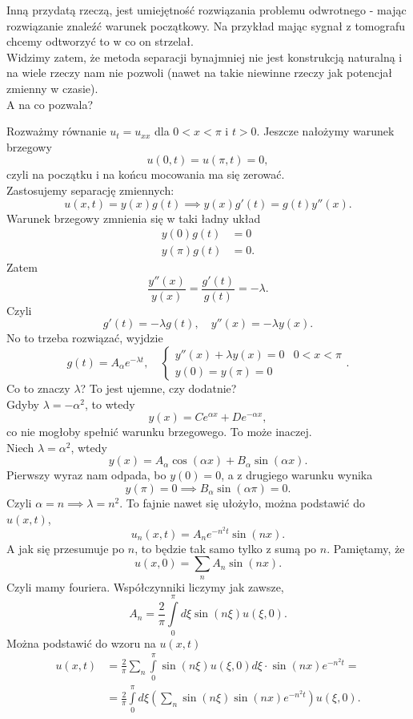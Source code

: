 \documentclass[../main.tex]{subfiles}
\begin{document}
				 Inną przydatą rzeczą, jest umiejętność rozwiązania problemu odwrotnego - mając rozwiązanie znaleźć warunek początkowy. Na przykład mając sygnał z tomografu chcemy odtworzyć to w co on strzelał.\\
				 Widzimy zatem, że metoda separacji bynajmniej nie jest konstrukcją naturalną i na wiele rzeczy nam nie pozwoli (nawet na takie niewinne rzeczy jak potencjał zmienny w czasie).\\
				 A na co pozwala?
				 \begin{przyklad}
				 		Rozważmy równanie $u_t = u_{x x}$ dla $0<x<\pi$ i $t > 0.$
						Jeszcze nałożymy warunek brzegowy
						 \[
								 u(0,t) = u(\pi,t) = 0
						 ,\]
						 czyli na początku i na końcu mocowania ma się zerować.\\
						 Zastosujemy separację zmiennych:
						 \[
								 u(x,t) = y(x) g(t) \implies y(x)g'(t) = g(t)y''(x)
						 .\]
						 Warunek brzegowy zmnienia się w taki ładny układ
						 \begin{align*}
								 y(0)g(t) &= 0\\
								 y(\pi)g(t) &= 0
						 .\end{align*}
						 Zatem
						 \[
								 \frac{y''(x)}{y(x)} = \frac{g'(t)}{g(t)} = -\lambda
						 .\]
						 Czyli
						 \[
								 g'(t) = -\lambda g(t),\quad y''(x) = -\lambda y(x)
						 .\]
						 No to trzeba rozwiązać, wyjdzie
						 \[
								 g(t) = A_\alpha e^{-\lambda t},\quad
								 \begin{cases}
										 y''(x) + \lambda y(x) = 0& 0 <x<\pi\\ y(0) = y(\pi) = 0
								 \end{cases}
						 .\]
						 Co to znaczy $\lambda$? To jest ujemne, czy dodatnie?\\
						 Gdyby $\lambda = -\alpha^2$, to wtedy
						 \[
								 y(x) = Ce^{\alpha x} + D e^{-\alpha x}
						 ,\]
						 co nie mogłoby spełnić warunku brzegowego. To może inaczej.\\
						 Niech $\lambda = \alpha^2$, wtedy
						 \[
								 y(x) = A_\alpha \cos(\alpha x) + B_\alpha \sin(\alpha x)
						 .\]
						 Pierwszy wyraz nam odpada, bo $y(0) = 0$, a z drugiego warunku wynika
						 \[
								 y(\pi) = 0 \implies B_\alpha \sin(\alpha\pi) = 0
						 .\]
						 Czyli $\alpha = n \implies \lambda = n^2$. To fajnie nawet się ułożyło, można podstawić do $u(x,t)$,
						 \[
								 u_n(x,t) = A_n e^{-n^2 t} \sin(nx)
						 .\]
						 A jak się przesumuje po $n$, to będzie tak samo tylko z sumą po $n$.
						 Pamiętamy, że
						 \[
								 u(x,0) = \sum_n A_n \sin(nx)
						 .\]
						 Czyli mamy fouriera. Współczynniki liczymy jak zawsze,
						 \[
								 A_n = \frac{2}{\pi}\int\limits_{0}^\pi d\xi \sin\left( n\xi \right) u(\xi, 0)
						 .\]
						 Można podstawić do wzoru na $u(x,t)$
						 \begin{align*}
								 u(x,t) &= \frac{2}{\pi}\sum_n \int\limits_0^\pi \sin(n\xi)u(\xi,0)d\xi \cdot \sin(n x) e^{-n^2 t} = \\
								 &= \frac{2}{\pi}\int\limits_0^\pi d\xi \left( \sum_n \sin(n\xi) \sin(nx) e^{-n^2 t} \right) u(\xi,0)
						 .\end{align*}
				 \end{przyklad}
\end{document}
